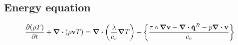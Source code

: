 
\subsection{Energy equation}

\begin{equation} \label{eq:cde_energy_equation}
	\pdv{(\rho T)}{t} + \div(\rho \vb{v} T) = 
	\div(\frac{\lambda}{c_v} \grad{T}) + 
	\left\{ \frac{\vb{\tau} \circ \grad{\vb{v}} - \div{\dot{\vb{q}}^R} - p \div{\vb{v}}}{c_v}\right\}
\end{equation}


